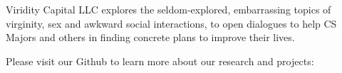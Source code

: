 \thispagestyle{empty}

Viridity Capital LLC explores the seldom-explored, embarrassing topics of virginity, sex and awkward social interactions, to open dialogues to help CS Majors and others in finding concrete plans to improve their lives.

Please visit our Github to learn more about our research and projects: \href{https://github.com/viriditycapital/}{}
